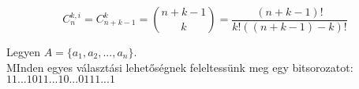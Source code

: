 \documentclass{beamer}
\begin{document}
\begin{frame}

\begin{tcolorbox}[title={Tétel: Ismétléses kombinációk száma}]
$$C_n^{k, i} = C_{n + k -1}^k = {{n + k - 1}\choose{k}} = \frac{(n + k - 1)!}{k!((n + k - 1) - k)!} $$

\end{tcolorbox}

\begin{tcolorbox}[title={Bizonyítás}]
Legyen $A = \{a_1, a_2, ..., a_n\}$.\\
MInden egyes választási lehetőségnek feleltessünk meg egy bitsorozatot:\\
$1 1 ... 1 0 1 1 ... 1 0 ... 0 1 1 1 ... 1$\\


\end{tcolorbox}

\end{frame}

\begin{frame}

\begin{tcolorbox}[title={Tétel: Ismétléses permutációk száma}]
\end{tcolorbox}

\begin{tcolorbox}[title={Bizonyítás}]
\end{tcolorbox}

\end{frame}

\begin{frame}

\begin{tcolorbox}[title={Tétel: Binomiális tétel}]
\end{tcolorbox}

\begin{tcolorbox}[title={Bizonyítás}]
\end{tcolorbox}

\end{frame}

\begin{frame}

\begin{tcolorbox}[title={Tétel: Logikai szita formula}]
\end{tcolorbox}

\begin{tcolorbox}[title={Bizonyítás}]
\end{tcolorbox}

\end{frame}








\begin{frame}

\begin{tcolorbox}[title={Tétel: Egységelem és inverz félcsoportban}]
\end{tcolorbox}

\begin{tcolorbox}[title={Bizonyítás}]
\end{tcolorbox}

\end{frame}
\end{document}
